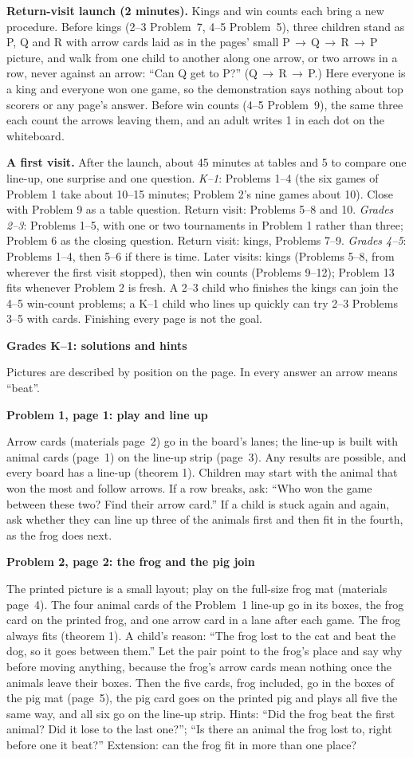 \documentclass[11pt]{article}
\newcommand{\head}[1]{\par\needspace{6\baselineskip}\vspace{2pt}\textbf{\large #1}\par}
\newcommand{\sub}[1]{\par\needspace{3\baselineskip}\textbf{#1}\par}
\begin{document}
\textbf{Return-visit launch (2 minutes).} Kings and win counts each bring a new procedure. Before kings (2--3 Problem~7, 4--5 Problem~5), three children stand as P, Q and R with arrow cards laid as in the pages' small P\,$\to$\,Q\,$\to$\,R\,$\to$\,P picture, and walk from one child to another along one arrow, or two arrows in a row, never against an arrow: ``Can Q get to P?'' (Q\,$\to$\,R\,$\to$\,P.) Here everyone is a king and everyone won one game, so the demonstration says nothing about top scorers or any page's answer. Before win counts (4--5 Problem~9), the same three each count the arrows leaving them, and an adult writes 1 in each dot on the whiteboard.

\textbf{A first visit.} After the launch, about 45 minutes at tables and 5 to compare one line-up, one surprise and one question. \emph{K--1}: Problems 1--4 (the six games of Problem 1 take about 10--15 minutes; Problem 2's nine games about 10). Close with Problem 9 as a table question. Return visit: Problems 5--8 and 10. \emph{Grades 2--3}: Problems 1--5, with one or two tournaments in Problem 1 rather than three; Problem 6 as the closing question. Return visit: kings, Problems 7--9. \emph{Grades 4--5}: Problems 1--4, then 5--6 if there is time. Later visits: kings (Problems 5--8, from wherever the first visit stopped), then win counts (Problems 9--12); Problem 13 fits whenever Problem 2 is fresh. A 2--3 child who finishes the kings can join the 4--5 win-count problems; a K--1 child who lines up quickly can try 2--3 Problems 3--5 with cards. Finishing every page is not the goal.

\head{Grades K--1: solutions and hints}
Pictures are described by position on the page. In every answer an arrow means ``beat''.

\sub{Problem 1, page 1: play and line up}
Arrow cards (materials page~2) go in the board's lanes; the line-up is built with animal cards (page~1) on the line-up strip (page~3). Any results are possible, and every board has a line-up (theorem 1). Children may start with the animal that won the most and follow arrows. If a row breaks, ask: ``Who won the game between these two? Find their arrow card.'' If a child is stuck again and again, ask whether they can line up three of the animals first and then fit in the fourth, as the frog does next.

\sub{Problem 2, page 2: the frog and the pig join}
The printed picture is a small layout; play on the full-size frog mat (materials page~4). The four animal cards of the Problem~1 line-up go in its boxes, the frog card on the printed frog, and one arrow card in a lane after each game. The frog always fits (theorem 1). A child's reason: ``The frog lost to the cat and beat the dog, so it goes between them.'' Let the pair point to the frog's place and say why before moving anything, because the frog's arrow cards mean nothing once the animals leave their boxes. Then the five cards, frog included, go in the boxes of the pig mat (page~5), the pig card goes on the printed pig and plays all five the same way, and all six go on the line-up strip. Hints: ``Did the frog beat the first animal? Did it lose to the last one?''; ``Is there an animal the frog lost to, right before one it beat?'' Extension: can the frog fit in more than one place?
\end{document}
